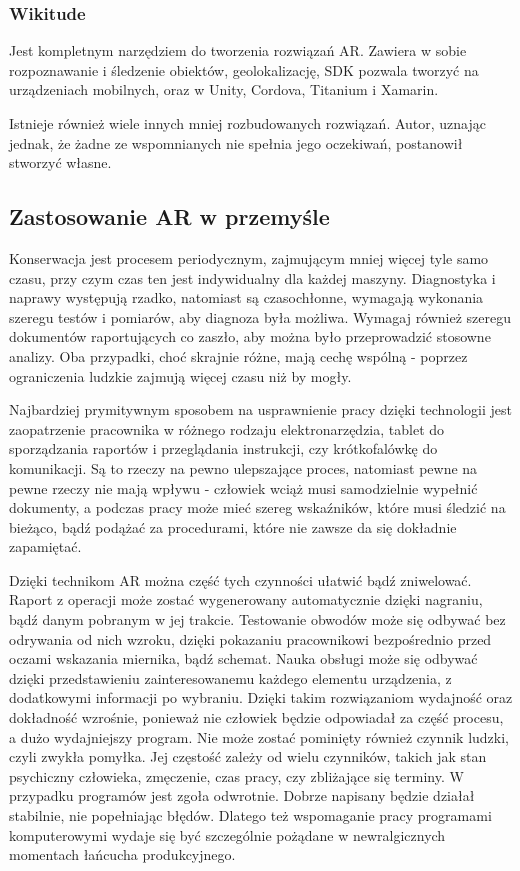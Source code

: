 \documentclass[12pt,twoside,polish]{article}
\begin{document}
\subsubsection*{Wikitude}
Jest kompletnym narzędziem do tworzenia rozwiązań AR. Zawiera w sobie rozpoznawanie i śledzenie obiektów, geolokalizację, SDK pozwala tworzyć na urządzeniach mobilnych, oraz w Unity, Cordova, Titanium i Xamarin.

\vspace{5mm}

Istnieje również wiele innych mniej rozbudowanych rozwiązań. Autor, uznając jednak, że żadne ze wspomnianych nie spełnia jego oczekiwań, postanowił stworzyć własne.


\subsection{Zastosowanie AR w przemyśle}
Konserwacja jest procesem periodycznym, zajmującym mniej więcej tyle samo czasu, przy czym czas ten jest indywidualny dla każdej maszyny. Diagnostyka i naprawy występują rzadko, natomiast są czasochłonne, wymagają wykonania szeregu testów i pomiarów, aby diagnoza była możliwa. Wymagaj również szeregu dokumentów raportujących co zaszło, aby można było przeprowadzić stosowne analizy. Oba przypadki, choć skrajnie różne, mają cechę wspólną - poprzez ograniczenia ludzkie zajmują więcej czasu niż by mogły.

Najbardziej prymitywnym sposobem na usprawnienie pracy dzięki technologii jest zaopatrzenie pracownika w różnego rodzaju elektronarzędzia, tablet do sporządzania raportów i przeglądania instrukcji, czy krótkofalówkę do komunikacji. Są to rzeczy na pewno ulepszające proces, natomiast pewne na pewne rzeczy nie mają wpływu - człowiek wciąż musi samodzielnie wypełnić dokumenty, a podczas pracy może mieć szereg wskaźników, które musi śledzić na bieżąco, bądź podążać za procedurami, które nie zawsze da się dokładnie zapamiętać.

Dzięki technikom AR można część tych czynności ułatwić bądź zniwelować. Raport z operacji może zostać wygenerowany automatycznie dzięki nagraniu, bądź danym pobranym w jej trakcie. Testowanie obwodów może się odbywać bez odrywania od nich wzroku, dzięki pokazaniu pracownikowi bezpośrednio przed oczami wskazania miernika, bądź schemat. Nauka obsługi może się odbywać dzięki przedstawieniu zainteresowanemu każdego elementu urządzenia, z dodatkowymi informacji po wybraniu. Dzięki takim rozwiązaniom wydajność oraz dokładność wzrośnie, ponieważ nie człowiek będzie odpowiadał za część procesu, a dużo wydajniejszy program. Nie może zostać pominięty również czynnik ludzki, czyli zwykła pomyłka. Jej częstość zależy od wielu czynników, takich jak stan psychiczny człowieka, zmęczenie, czas pracy, czy zbliżające się terminy. W przypadku programów jest zgoła odwrotnie. Dobrze napisany będzie działał stabilnie, nie popełniając błędów. Dlatego też wspomaganie pracy programami komputerowymi wydaje się być szczególnie pożądane w newralgicznych momentach łańcucha produkcyjnego.
\end{document}
